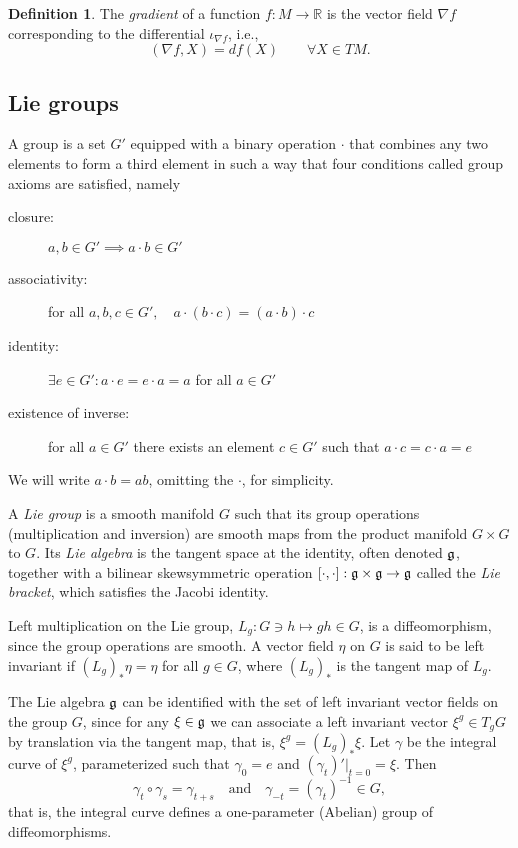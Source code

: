 \documentclass{article}
\theoremstyle{plain}
\theoremstyle{definition}
\newtheorem{defin}[teo]{Definition}
\newcommand{\R}{\ensuremath{\mathbb{R}}}
\newcommand{\mf}{\ensuremath{\mathfrak}}
\begin{document}
\begin{defin}
	The \textit{gradient} of a function $f:M\to \R$ is the vector field $\nabla f$ corresponding to the differential $\iota_{\nabla f}$, i.e., %
	\[
	(\nabla f,X)=df(X)\qquad \forall X\in TM.
	\]
\end{defin}

\subsection{Lie groups}
A  group is a set $G'$ equipped with a binary operation $\cdot$ that combines any two elements to form a third element in such a way that four conditions called group axioms are satisfied, namely
%
\begin{description}
	\item[closure:] $a,b\in G' \implies a\cdot b\in G'$
	\item[associativity:] for all $a,b,c\in G',\quad a\cdot(b\cdot c)=(a\cdot b)\cdot c$
	\item[identity:] $\exists e\in G' : a\cdot e=e\cdot a=a$ for all $a\in G'$
	\item[existence of inverse:] for all $a\in G'$ there exists an element $c\in G'$ such that $a\cdot c=c\cdot a=e$
\end{description}
%
We will write $a\cdot b=ab$, omitting the $\cdot$, for simplicity.

A \textit{Lie group} is a smooth manifold $G$ such that its group operations (multiplication and inversion) are smooth maps from the product manifold $G\times G$ to $G$. Its \textit{Lie algebra} is the tangent space at the identity, often denoted $\mf g$, together with a bilinear skewsymmetric operation $[\cdot,\cdot]:\mf g \times \mf g \to\mf g$ called the \textit{Lie bracket}, which satisfies the Jacobi identity. 

Left multiplication on the Lie group, $L_g: G\ni h\mapsto gh\in G$, is a diffeomorphism, since the group operations are smooth. A vector field $\eta$ on $G$ is said to be left invariant if $(L_g)_*\eta=\eta$ for all $g\in G$, where $(L_g)_*$ is the tangent map of $L_g$.

The Lie algebra $\mf g$ can be identified with the set of left invariant vector fields on the group $G$, since for any $\xi\in\mf g$ we can associate a left invariant vector $\xi^g\in T_gG$ by translation via the tangent map, that is, $\xi^g=(L_g)_*\xi$. Let $\gamma$ be the integral curve of $\xi^g$, parameterized such that $\gamma_0=e$ and $(\gamma_t)'|_{t=0}=\xi$. Then
\[
  \gamma_t\circ \gamma_s=\gamma_{t+s}\quad \mathrm{and}\quad \gamma_{-t}=(\gamma_t)^{-1}\in G,
\]
that is, the integral curve defines a one-parameter (Abelian) group of diffeomorphisms.
\end{document}
